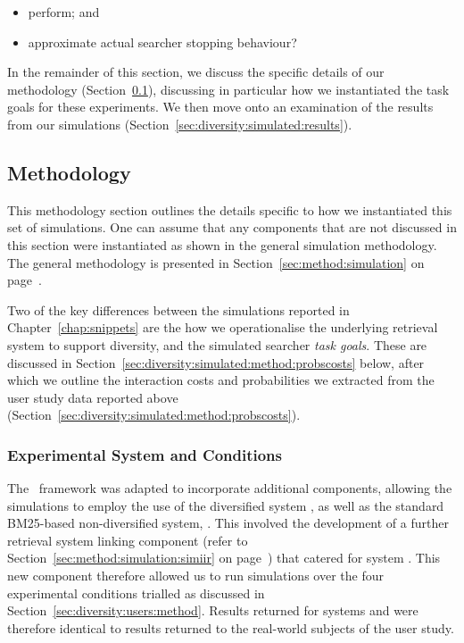 \begin{itemize}
    \item{ perform; and}
    \item{ approximate actual searcher stopping behaviour?}
\end{itemize}

In the remainder of this section, we discuss the specific details of our methodology (Section~\ref{sec:diversity:simulated:method}), discussing in particular how we instantiated the task goals for these experiments. We then move onto an examination of the results from our simulations (Section~\ref{sec:diversity:simulated:results}).

\subsection{Methodology}\label{sec:diversity:simulated:method}
This methodology section outlines the details specific to how we instantiated this set of simulations. One can assume that any components that are not discussed in this section were instantiated as shown in the general simulation methodology. The general methodology is presented in Section~\ref{sec:method:simulation} on page~\pageref{sec:method:simulation}.

Two of the key differences between the simulations reported in Chapter~\ref{chap:snippets} are the how we operationalise the underlying retrieval system to support diversity, and the simulated searcher \emph{task goals}. These are discussed in Section~\ref{sec:diversity:simulated:method:probscosts} below, after which we outline the interaction costs and probabilities we extracted from the user study data reported above (Section~\ref{sec:diversity:simulated:method:probscosts}).

\subsubsection{Experimental System and Conditions}\label{sec:diversity:simulated:method:system}
The \simiir~framework was adapted to incorporate additional components, allowing the simulations to employ the use of the diversified system , as well as the standard BM25-based non-diversified system, . This involved the development of a further retrieval system linking component (refer to Section~\ref{sec:method:simulation:simiir} on page~\pageref{sec:method:simulation:simiir}) that catered for system . This new component therefore allowed us to run simulations over the four experimental conditions trialled as discussed in Section~\ref{sec:diversity:users:method}. Results returned for systems  and  were therefore identical to results returned to the real-world subjects of the user study.

